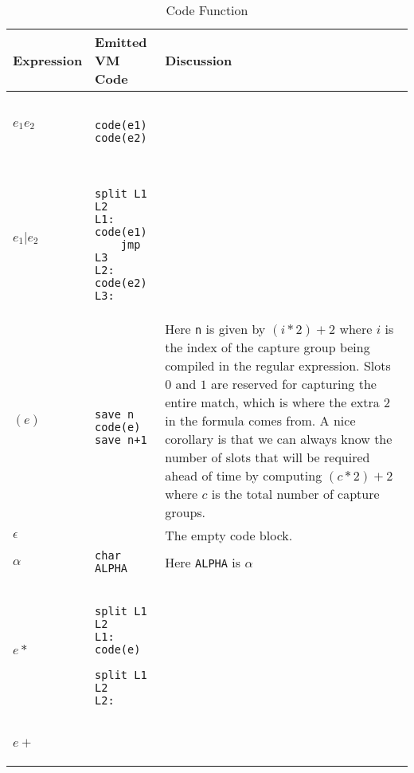\begin{table}[ht]
\label{table:codedef}
\caption{Code Function}

\centering
\begin{tabular}{| l | l | p{8cm} |} \hline
Expression & Emitted VM Code & Discussion \\ \hline
$e_1 e_2$ &
  \begin{minipage}{3cm}
  \begin{verbatim}

code(e1)
code(e2)
  \end{verbatim}
  \end{minipage}
  & \\ \hline
$e_1 \rvert e_2$ &
  \begin{minipage}{3cm}
  \begin{verbatim}

split L1 L2
L1: code(e1)
    jmp L3
L2: code(e2)
L3:
  \end{verbatim}
  \end{minipage}
  & \\ \hline
$(e)$ &
  \begin{minipage}{3cm}
  \begin{verbatim}

save n
code(e)
save n+1
  \end{verbatim}
  \end{minipage}
  & 
  Here \verb'n' is given by $(i*2) + 2$ where $i$ is the index of
  the capture group being compiled in the regular expression. Slots $0$
  and $1$ are reserved for capturing the entire match, which is
  where the extra $2$ in the formula comes from. A nice corollary
  is that we can always know the number of slots that
  will be required ahead of time by computing $(c*2) + 2$
  where $c$ is the total number of capture groups.
  \\ \hline
$\epsilon$ & & The empty code block.  \\ \hline
$\alpha$ & \verb'char ALPHA' & Here \verb'ALPHA' is $\alpha$ \\ \hline
$e*$ &
  \begin{minipage}{3cm}
  \begin{verbatim}

split L1 L2
L1: code(e)
    split L1 L2
L2: 
  \end{verbatim}
  \end{minipage}
  & \\ \hline
$e+$ &
  \begin{minipage}{3cm}
  \begin{verbatim}


\end{verbatim}
\end{minipage}
\end{tabular}
\end{table}
